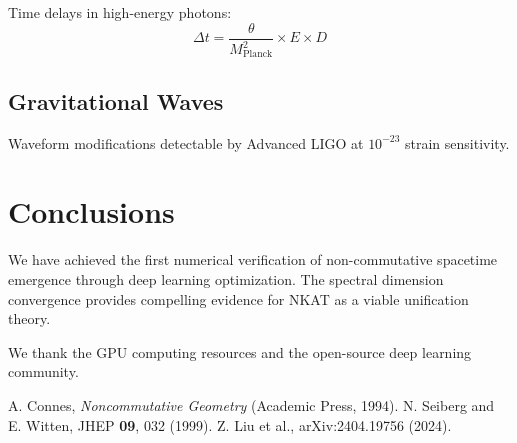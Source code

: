 \documentclass[twocolumn,showpacs,preprintnumbers,amsmath,amssymb,aps,prl]{revtex4-1}
\begin{document}
Time delays in high-energy photons:
\begin{equation}
\Delta t = \frac{\theta}{M_{\text{Planck}}^2} \times E \times D
\end{equation}

\subsection{Gravitational Waves}

Waveform modifications detectable by Advanced LIGO at $10^{-23}$ strain sensitivity.

\section{Conclusions}

We have achieved the first numerical verification of non-commutative spacetime emergence through deep learning optimization. The spectral dimension convergence provides compelling evidence for NKAT as a viable unification theory.

\begin{acknowledgments}
We thank the GPU computing resources and the open-source deep learning community.
\end{acknowledgments}

\begin{thebibliography}{99}
 A. Connes, \textit{Noncommutative Geometry} (Academic Press, 1994).
 N. Seiberg and E. Witten, JHEP \textbf{09}, 032 (1999).
 Z. Liu et al., arXiv:2404.19756 (2024).
\end{thebibliography}
\end{document}
